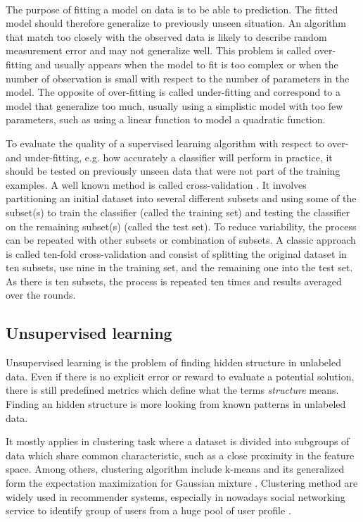 \paragraph{} The purpose of fitting a model on data is to be able to prediction. The fitted model should therefore generalize to previously unseen situation. An algorithm that match too closely with the observed data is likely to describe random measurement error and may not generalize well. This problem is called over-fitting and usually appears when the model to fit is too complex or when the number of observation is small with respect to the number of parameters in the model. The opposite of over-fitting is called under-fitting and correspond to a model that generalize too much, usually using a simplistic model with too few parameters, such as using a linear function to model a quadratic function.

To evaluate the quality of a supervised learning algorithm with respect to over- and under-fitting, e.g. how accurately a classifier will perform in practice, it should be tested on previously unseen data that were not part of the training examples. A well known method is called cross-validation \cite{kohavi1995study}. It involves partitioning an initial dataset into several different subsets and using some of the subset(s) to train the classifier (called the training set) and testing the classifier on the remaining subset(s) (called the test set). To reduce variability, the process can be repeated with other subsets or combination of subsets. A classic approach is called ten-fold cross-validation and consist of splitting the original dataset in ten subsets, use nine in the training set, and the remaining one into the test set. As there is ten subsets, the process is repeated ten times and results averaged over the rounds.

\subsection{Unsupervised learning}

Unsupervised learning is the problem of finding hidden structure in unlabeled data. Even if there is no explicit error or reward to evaluate a potential solution, there is still predefined metrics which define what the terms \emph{structure} means. Finding an hidden structure is more looking from known patterns in unlabeled data.

It mostly applies in clustering task where a dataset is divided into subgroups of data which share common characteristic, such as a close proximity in the feature space. Among others, clustering algorithm include k-means and its generalized form the expectation maximization for Gaussian mixture \cite{dempster1977maximum}. Clustering method are widely used in recommender systems, especially in nowadays social networking service to identify group of users from a huge pool of user profile \cite{sarwar2002recommender}.

